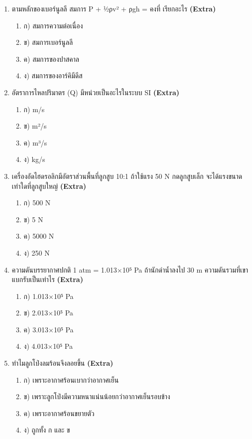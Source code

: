 \documentclass[12pt]{article}
\begin{document}
\begin{enumerate}[label=\arabic*.]
\item ตามหลักของเบอร์นูลลี สมการ P + ½ρv² + ρgh = คงที่ เรียกอะไร \hfill \textbf{\small (Extra)}
\begin{enumerate}[label=)]
\item ก) สมการความต่อเนื่อง
\item ข) สมการเบอร์นูลลี
\item ค) สมการของปาสคาล
\item ง) สมการของอาร์คิมีดีส
\end{enumerate}
\item อัตราการไหลปริมาตร (Q) มีหน่วยเป็นอะไรในระบบ SI \hfill \textbf{\small (Extra)}
\begin{enumerate}[label=)]
\item ก) m/s
\item ข) m²/s
\item ค) m³/s
\item ง) kg/s
\end{enumerate}
\item เครื่องอัดไฮดรอลิกมีอัตราส่วนพื้นที่ลูกสูบ 10:1 ถ้าใช้แรง 50 N กดลูกสูบเล็ก จะได้แรงขนาดเท่าใดที่ลูกสูบใหญ่ \hfill \textbf{\small (Extra)}
\begin{enumerate}[label=)]
\item ก) 500 N
\item ข) 5 N
\item ค) 5000 N
\item ง) 250 N
\end{enumerate}
\item ความดันบรรยากาศปกติ 1 atm = 1.013×10⁵ Pa ถ้านักดำน้ำลงไป 30 m ความดันรวมที่เขาแบกรับเป็นเท่าไร \hfill \textbf{\small (Extra)}
\begin{enumerate}[label=)]
\item ก) 1.013×10⁵ Pa
\item ข) 2.013×10⁵ Pa
\item ค) 3.013×10⁵ Pa
\item ง) 4.013×10⁵ Pa
\end{enumerate}
\item ทำไมลูกโป่งลมร้อนจึงลอยขึ้น \hfill \textbf{\small (Extra)}
\begin{enumerate}[label=)]
\item ก) เพราะอากาศร้อนเบากว่าอากาศเย็น
\item ข) เพราะลูกโป่งมีความหนาแน่นน้อยกว่าอากาศเย็นรอบข้าง
\item ค) เพราะอากาศร้อนขยายตัว
\item ง) ถูกทั้ง ก และ ข
\end{enumerate}

\end{enumerate}
\end{document}

